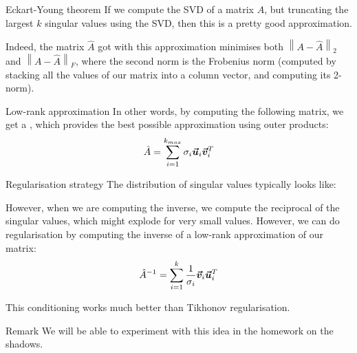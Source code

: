 \documentclass[a4paper]{article}
\begin{document}
\begin{parag}{Eckart-Young theorem}
    If we compute the SVD of a matrix $A$, but truncating the largest $k$ singular values using the SVD, then this is a pretty good approximation.

    Indeed, the matrix $\hat{A}$ got with this approximation minimises both $\left\|A - \hat{A}\right\|_2$ and $\left\|A - \hat{A}\right\|_F$, where the second norm is the Frobenius norm (computed by stacking all the values of our matrix into a column vector, and computing its 2-norm).

    \begin{subparag}{Low-rank approximation}
        In other words, by computing the following matrix, we get a , which provides the best possible approximation using outer products: 
        \[\hat{A} = \sum_{i=1}^{k_{max}} \sigma_i \bm{\protect\vec{u}}_i \bm{\protect\vec{v}}_i^T\]
    \end{subparag}
\end{parag}

\begin{parag}{Regularisation strategy}
    The distribution of singular values typically looks like:

    However, when we are computing the inverse, we compute the reciprocal of the singular values, which might explode for very small values. However, we can do regularisation by computing the inverse of a low-rank approximation of our matrix: 
    \[\hat{A}^{-1} = \sum_{i=1}^{k} \frac{1}{\sigma_i} \bm{\protect\vec{v}}_i \bm{\protect\vec{u}}_i^T\]
    

    This conditioning works much better than Tikhonov regularisation.

    \begin{subparag}{Remark}
        We will be able to experiment with this idea in the homework on the shadows.
    \end{subparag}
\end{parag}
\end{document}
